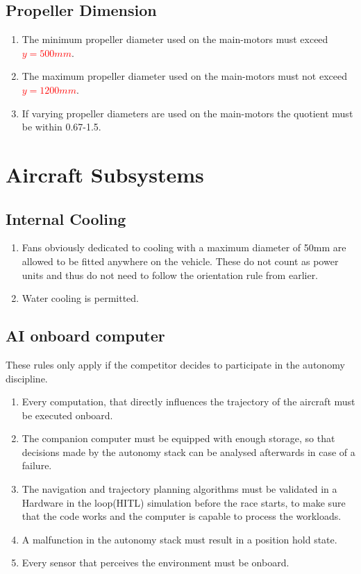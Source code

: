 \documentclass{article}
\begin{document}
\subsection{Propeller Dimension}
\begin{enumerate}
  \item The minimum propeller diameter used on the main-motors must exceed \textcolor{red}{$y=500mm$}.
  \item The maximum propeller diameter used on the main-motors must not exceed \textcolor{red}{$y=1200mm$}.
  \item If varying propeller diameters are used on the main-motors the quotient must be within 0.67-1.5.
\end{enumerate}





\section{Aircraft Subsystems}

\subsection{Internal Cooling}
\begin{enumerate}
  \item Fans obviously dedicated to cooling with a maximum diameter of 50mm are allowed to be fitted anywhere on the vehicle. These do not count as power units and thus do not need to follow the orientation rule from earlier.
  \item Water cooling is permitted. 
\end{enumerate}

\subsection{AI onboard computer}
These rules only apply if the competitor decides to participate in the autonomy discipline. 
\begin{enumerate}
  \item Every computation, that directly influences the trajectory of the aircraft must be executed onboard.
  \item The companion computer must be equipped with enough storage, so that decisions made by the autonomy stack can be analysed afterwards in case of a failure. 
  \item The navigation and trajectory planning algorithms must be validated in a Hardware in the loop(HITL) simulation before the race starts, to make sure that the code works and the computer is capable to process the workloads.
  \item A malfunction in the autonomy stack must result in a position hold state. 
  \item Every sensor that perceives the environment must be onboard.
\end{enumerate}
\end{document}
